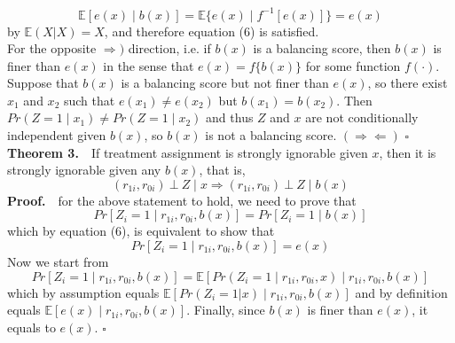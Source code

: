 \documentclass[12pt]{article}
\newcommand*{\QEDA}{\null\nobreak\hfill\ensuremath{\square}}%
\begin{document}
$$\mathbb{E} [e(x) \mid b(x)] = \mathbb{E} \{e(x) \mid f^{-1}[e(x)]\} = e(x)$$
by $\mathbb{E} (X | X) = X$, and therefore equation (6) is satisfied. \\ 
For the opposite $\Rightarrow)$ direction, i.e. if $b(x)$ is a balancing score, then $b(x)$ is finer than $e(x)$ in the sense that $ e(x) = f\{b(x)\}$ for some function $f(\cdot)$. \\ 
Suppose that $b(x)$ is a balancing score but not finer than $e(x)$, so there exist $x_1$ and $x_2$ such that $e(x_1) \neq e(x_2)$ but $b(x_1) = b(x_2)$. 
Then $Pr(Z = 1 \mid x_1) \neq Pr(Z = 1 \mid x_2)$ and thus $Z$ and $x$ are not conditionally independent given $b(x)$, so $b(x)$ is not a balancing score. $(\Rightarrow \Leftarrow )$ \QEDA \\ 
\textbf{Theorem 3.}\ \ If treatment assignment is strongly ignorable given $x$, then it is strongly ignorable given any $b(x)$, that is,
$$(r_{1i}, r_{0i})\ \bot\ Z \mid x \Rightarrow (r_{1i}, r_{0i})\ \bot\ Z \mid b(x) $$
\textbf{Proof.}\ \ for the above statement to hold, we need to prove that 
$$Pr[Z_i = 1 \mid r_{1i}, r_{0i}, b(x)] = Pr[Z_i = 1 \mid b(x)]$$
which by equation (6), is equivalent to show that
$$Pr[Z_i = 1 \mid r_{1i}, r_{0i}, b(x)] = e(x)$$
Now we start from
$$Pr[Z_i = 1 \mid r_{1i}, r_{0i}, b(x)] = \mathbb{E} [Pr(Z_i = 1 \mid r_{1i}, r_{0i}, x) \mid r_{1i}, r_{0i}, b(x)]$$
which by assumption equals $\mathbb{E} [Pr(Z_i = 1 | x) \mid r_{1i}, r_{0i}, b(x)]$ and by definition equals $\mathbb{E} [e(x) \mid r_{1i}, r_{0i}, b(x)]$. 
Finally, since $b(x)$ is finer than $e(x)$, it equals to $e(x)$. \QEDA
\end{document}
